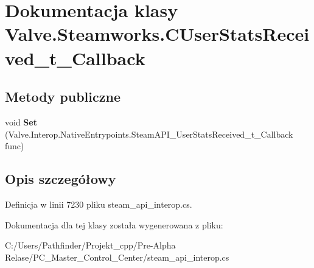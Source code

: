 \hypertarget{class_valve_1_1_steamworks_1_1_c_user_stats_received__t___callback}{}\section{Dokumentacja klasy Valve.\+Steamworks.\+C\+User\+Stats\+Received\+\_\+t\+\_\+\+Callback}
\label{class_valve_1_1_steamworks_1_1_c_user_stats_received__t___callback}
\subsection*{Metody publiczne}
\begin{DoxyCompactItemize}
\item 
\mbox{\label{class_valve_1_1_steamworks_1_1_c_user_stats_received__t___callback_accc68a50ed522e7a9db969a0dd22e25b}} 
void {\bfseries Set} (Valve.\+Interop.\+Native\+Entrypoints.\+Steam\+A\+P\+I\+\_\+\+User\+Stats\+Received\+\_\+t\+\_\+\+Callback func)
\end{DoxyCompactItemize}


\subsection{Opis szczegółowy}


Definicja w linii 7230 pliku steam\+\_\+api\+\_\+interop.\+cs.



Dokumentacja dla tej klasy została wygenerowana z pliku\+:\begin{DoxyCompactItemize}
\item 
C\+:/\+Users/\+Pathfinder/\+Projekt\+\_\+cpp/\+Pre-\/\+Alpha Relase/\+P\+C\+\_\+\+Master\+\_\+\+Control\+\_\+\+Center/steam\+\_\+api\+\_\+interop.\+cs\end{DoxyCompactItemize}

